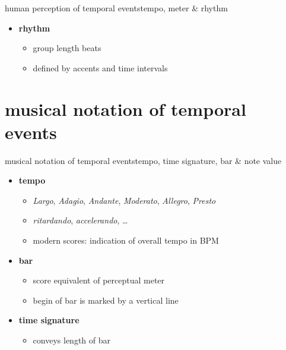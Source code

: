 \begin{frame}{human perception of temporal events}{tempo, meter \& rhythm}
\begin{itemize}
                \item<3->	\textbf{rhythm}
                    \begin{itemize}
                        \item	group length \unit[1--8]{beats}
                        \item	defined by accents and time intervals
                    \end{itemize}
            \end{itemize}
        \end{frame}

    \section[musical]{musical notation of temporal events}
        \begin{frame}{musical notation of temporal events}{tempo, time signature, bar \& note value}
            \begin{itemize}
                \item	\textbf{tempo}
                    \begin{itemize}
                        \item	\textsl{Largo}, \textsl{Adagio}, \textsl{Andante}, \textsl{Moderato}, \textsl{Allegro}, \textsl{Presto}
                        \item	\textsl{ritardando}, \textsl{accelerando}, \ldots
                        \item	modern scores: indication of overall tempo in \unit{BPM}
                    \end{itemize}
                \smallskip
                \item<1->	\textbf{bar}
                    \begin{itemize}
                        \item	score equivalent of perceptual meter
                        \item	begin of bar is marked by a vertical line
                    \end{itemize}
                \smallskip
                \item<1->	\textbf{time signature}
                    \begin{itemize}
                        \item	conveys length of bar
\end{itemize}
\end{itemize}
\end{frame}
